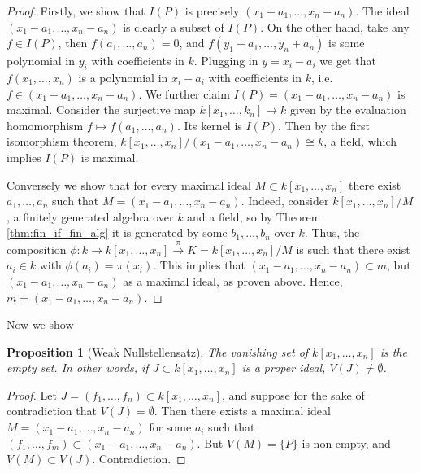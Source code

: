\documentclass[12pt]{article}
\newtheorem{proposition}{Proposition}[section]
\begin{document}
    \begin{proof}
        Firstly, we show that $I(P)$ is precisely $(x_1 - a_1, \dots, x_n - a_n)$. The ideal $(x_1 - a_1, \dots, x_n - a_n)$ is clearly a subset of $I(P)$. On the other hand, take any $f \in I(P)$, then $f(a_1, \dots, a_n) = 0$, and $f(y_1 + a_1, \dots, y_n + a_n)$ is some polynomial in $y_i$ with coefficients in $k$. Plugging in $y = x_i - a_i$ we get that $f(x_1, \dots, x_n)$ is a polynomial in $x_i - a_i$ with coefficients in $k$, i.e. $f \in (x_1-a_1, \dots, x_n-a_n)$. We further claim $I(P) = (x_1 - a_1, \dots, x_n - a_n)$ is maximal. Consider the surjective map $k[x_1, \dots, k_n] \to k $ given by the evaluation homomorphism $f \mapsto f(a_1, \dots, a_n)$. Its kernel is $I(P)$. Then by the first isomorphism theorem, $k[x_1, \dots, x_n]/(x_1- a_1, \dots, x_n - a_n) \cong k$, a field, which implies $I(P)$ is maximal. \par 
        Conversely we show that for every maximal ideal $M \subset k[x_1, \dots, x_n]$ there exist $a_1, \dots, a_n$ such that $M = (x_1 - a_1, \dots, x_n - a_n)$. Indeed, consider $k[x_1, \dots, x_n]/M$, a finitely generated algebra over $k$ and a field, so by Theorem \ref{thm:fin_if_fin_alg} it is generated by some $b_1, \dots, b_n$ over $k$. Thus, the composition $\phi: k \to k[x_1, \dots, x_n] \xrightarrow{\pi} K = k[x_1, \dots, x_n]/M$ is such that there exist $a_i \in k$ with $\phi(a_i) = \pi(x_i)$. This implies that $(x_1 - a_1, \dots, x_n - a_n) \subset m$, but $(x_1 - a_1, \dots, x_n - a_n)$ as a maximal ideal, as proven above. Hence, $m = (x_1 - a_1, \dots, x_n - a_n)$. 
    \end{proof}

    Now we show 
    \begin{proposition}[Weak Nullstellensatz]
        The vanishing set of $k[x_1, \dots, x_n]$ is the empty set. In other words, if $J \subset k[x_1, \dots, x_n]$ is a proper ideal, $V(J) \neq \emptyset$. 
    \end{proposition}
    \begin{proof}
        Let $J = (f_1, \dots, f_n) \subset k[x_1, \dots, x_n]$, and suppose for the sake of contradiction that $V(J) = \emptyset$. Then there exists a maximal ideal $M = (x_1 - a_1, \dots, x_n - a_n)$ for some $a_i$ such that $(f_1, \dots, f_m) \subset (x_1-a_1, \dots, x_n - a_n)$. But $V(M) = \{P\}$ is non-empty, and $V(M) \subset V(J)$. Contradiction. 
    \end{proof} 
\end{document}
